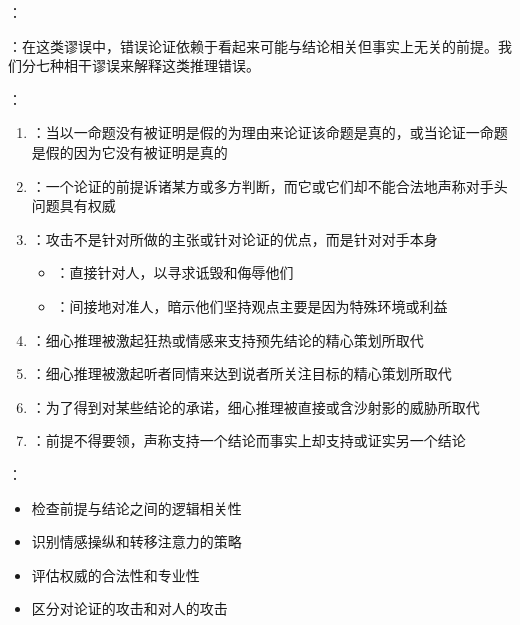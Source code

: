 ：
\begin{theorembox}[title=相干谬误的特征与类型]
：在这类谬误中，错误论证依赖于看起来可能与结论相关但事实上无关的前提。我们分七种相干谬误来解释这类推理错误。

：
\begin{enumerate}
  \item {}：当以一命题没有被证明是假的为理由来论证该命题是真的，或当论证一命题是假的因为它没有被证明是真的

  \item {}：一个论证的前提诉诸某方或多方判断，而它或它们却不能合法地声称对手头问题具有权威

  \item {}：攻击不是针对所做的主张或针对论证的优点，而是针对对手本身
  \begin{itemize}
    \item {}：直接针对人，以寻求诋毁和侮辱他们
    \item {}：间接地对准人，暗示他们坚持观点主要是因为特殊环境或利益
  \end{itemize}

  \item {}：细心推理被激起狂热或情感来支持预先结论的精心策划所取代

  \item {}：细心推理被激起听者同情来达到说者所关注目标的精心策划所取代

  \item {}：为了得到对某些结论的承诺，细心推理被直接或含沙射影的威胁所取代

  \item {}：前提不得要领，声称支持一个结论而事实上却支持或证实另一个结论
\end{enumerate}

：
\begin{itemize}
  \item 检查前提与结论之间的逻辑相关性
  \item 识别情感操纵和转移注意力的策略
  \item 评估权威的合法性和专业性
  \item 区分对论证的攻击和对人的攻击
\end{itemize}
\end{theorembox}

